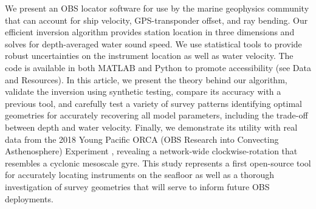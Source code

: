 We present an OBS locator software for use by the marine geophysics community that can account for ship velocity, GPS-transponder offset, and ray bending. Our efficient inversion algorithm provides station location in three dimensions and solves for depth-averaged water sound speed. We use statistical tools to provide robust uncertainties on the instrument location as well as water velocity. The code is available in both MATLAB and Python to promote accessibility (see Data and Resources). In this article, we present the theory behind our algorithm, validate the inversion using synthetic testing, compare its accuracy with a previous tool, and carefully test a variety of survey patterns identifying optimal geometries for accurately recovering all model parameters, including the trade-off between depth and water velocity. Finally, we demonstrate its utility with real data from the 2018 Young Pacific ORCA (OBS Research into Convecting Asthenosphere) Experiment \citep{Gaherty2018}, revealing a network-wide clockwise-rotation that resembles a cyclonic mesoscale gyre. This study represents a first open-source tool for accurately locating instruments on the seafloor as well as a thorough investigation of survey geometries that will serve to inform future OBS deployments.
